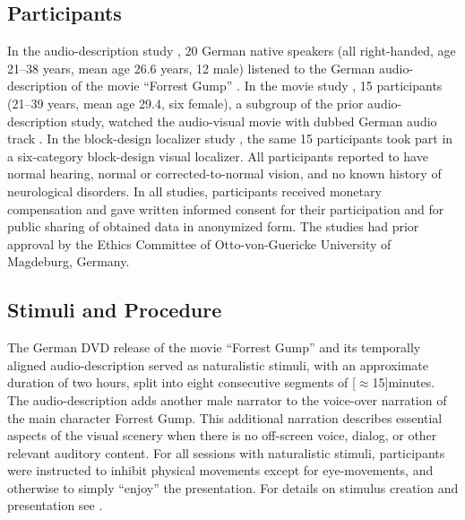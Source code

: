 \documentclass[english,11pt]{article}
\begin{document}
\subsection*{Participants}
In the audio-description study \citep{hanke2014audiomovie}, 20 German native
speakers (all right-handed, age 21–38 years, mean age 26.6 years, 12 male)
listened to the German audio-description \citep{ForrestGumpGermanAD} of the
movie ``Forrest Gump'' \citep{ForrestGumpMovie}.
In the movie study \citep{hanke2016simultaneous}, 15 participants (21–39 years,
mean age 29.4, six female), a subgroup of the prior audio-description study,
watched the audio-visual movie with dubbed German audio track
\citep{ForrestGumpDVD}.
In the block-design localizer study \citep{sengupta2016extension}, the same 15
participants took part in a six-category block-design visual localizer.
All participants reported to have normal hearing, normal or corrected-to-normal
vision, and no known history of neurological disorders.
In all studies, participants received monetary compensation and gave written
informed consent for their participation and for public sharing of obtained data
in anonymized form. The studies had prior approval by the Ethics Committee of
Otto-von-Guericke University of Magdeburg, Germany.


\subsection*{Stimuli and Procedure}

The German DVD release \citep{ForrestGumpDVD} of the movie ``Forrest Gump''
\citep{ForrestGumpMovie} and its temporally aligned audio-description
\citep{ForrestGumpGermanAD} served as naturalistic stimuli, with an approximate
duration of two hours, split into eight consecutive segments of
\unit[$\approx$15]{minutes}.
The audio-description adds another male narrator to the voice-over narration of
the main character Forrest Gump. This additional narration describes essential
aspects of the visual scenery when there is no off-screen voice, dialog, or
other relevant auditory content.
For all sessions with naturalistic stimuli, participants were instructed to
inhibit physical movements except for eye-movements, and otherwise to simply
``enjoy'' the presentation.
%
For details on stimulus creation and presentation see
\citet{hanke2014audiomovie,hanke2016simultaneous}.
\end{document}
